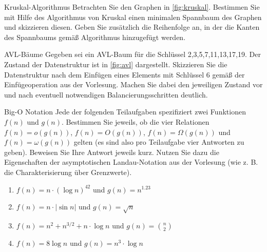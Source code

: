 \documentclass{article}
\begin{document}
\begin{exercise}{Kruskal-Algorithmus}
  Betrachten Sie den Graphen in \ref{fig:kruskal}. Bestimmen Sie mit Hilfe des Algorithmus von Kruskal einen minimalen Spannbaum des Graphen und skizzieren diesen. Geben Sie zusätzlich die Reihenfolge an, in der die Kanten des Spannbaums gemäß Algorithmus hinzugefügt werden.
  

  \begin{solution}

  \end{solution}
\end{exercise}

\begin{exercise}{AVL-Bäume}
  Gegeben sei ein AVL-Baum für die Schlüssel {2,3,5,7,11,13,17,19}. Der Zustand der Datenstruktur ist in \ref{fig:avl} dargestellt. Skizzieren Sie die Datenstruktur nach dem Einfügen eines Elements mit Schlüssel 6 gemäß der Einfügeoperation aus der Vorlesung. Machen Sie dabei den jeweiligen Zustand vor und nach eventuell notwendigen Balancierungsschritten deutlich.
  

  \begin{solution}

  \end{solution}
\end{exercise}

\begin{exercise}{Big-O Notation}
  Jede der folgenden Teilaufgaben spezifiziert zwei Funktionen $f(n)$ und $g(n)$. Bestimmen Sie jeweils, ob die vier Relationen $f(n) = o(g(n))$, $f(n) = O(g(n))$, $f(n) = \Omega(g(n))$ und $f(n) = \omega(g(n))$ gelten (es sind also pro Teilaufgabe vier Antworten zu geben). Beweisen Sie Ihre Antwort jeweils kurz. Nutzen Sie dazu die Eigenschaften der asymptotischen Landau-Notation aus der Vorlesung (wie z. B. die Charakterisierung über Grenzwerte).
  \begin{enumerate}
    \item $f(n) = n \cdot (\log n)^{42}$ und $g(n) = n^{1.23}$
    \item $f(n) = n \cdot |\sin n|$ und $g(n) = \sqrt{n}$
    \item $f(n) = n^2 + n^{3/2} + n \cdot \log n$ und $g(n) = \binom{n}{2}$
    \item $f(n) = 8 \log n$ und $g(n) = n^3 \cdot \log n$
  \end{enumerate}

  \begin{solution}

  \end{solution}
\end{exercise}
\end{document}
